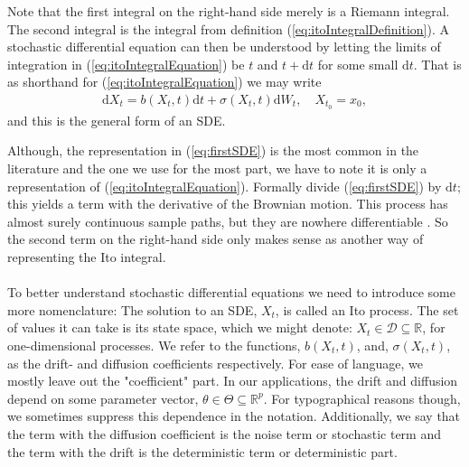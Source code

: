 Note that the first integral on the right-hand side merely is a Riemann integral. The second integral is the integral from definition (\ref{eq:itoIntegralDefinition}). A stochastic differential equation can then be understood by letting the limits of integration in (\ref{eq:itoIntegralEquation}) be $t$ and $t+\mathrm{d}t$ for some small $\mathrm{d}t$. That is as shorthand for (\ref{eq:itoIntegralEquation}) we may write
\begin{align}
    \mathrm{d}X_t = b(X_t, t)\mathrm{d}t + \sigma(X_t, t)\mathrm{d}W_t, \quad X_{t_0} = x_0 \label{eq:firstSDE},
\end{align}
and this is the general form of an SDE. 

Although, the representation in (\ref{eq:firstSDE}) is the most common in the literature and the one we use for the most part, we have to note it is only a representation of (\ref{eq:itoIntegralEquation}). Formally divide (\ref{eq:firstSDE}) by $\mathrm{d}t$; this yields a term with the derivative of the Brownian motion. This process has almost surely continuous sample paths, but they are nowhere differentiable \cite[theorem 11.22 and theorem 11.35]{Hansen2022}. So the second term on the right-hand side only makes sense as another way of representing the Ito integral. \\\\
To better understand stochastic differential equations we need to introduce some more nomenclature: The solution to an SDE, $X_t$, is called an Ito process. The set of values it can take is its state space, which we might denote: $X_t\in\mathcal{D}\subseteq\mathbb{R}$, for one-dimensional processes. We refer to the functions, $b(X_t, t)$, and, $\sigma(X_t, t)$, as the drift- and diffusion coefficients respectively. For ease of language, we mostly leave out the "coefficient" part. In our applications, the drift and diffusion depend on some parameter vector, $\theta\in\Theta\subseteq\mathbb{R}^p$. For typographical reasons though, we sometimes suppress this dependence in the notation. Additionally, we say that the term with the diffusion coefficient is the noise term or stochastic term and the term with the drift is the deterministic term or deterministic part. 

